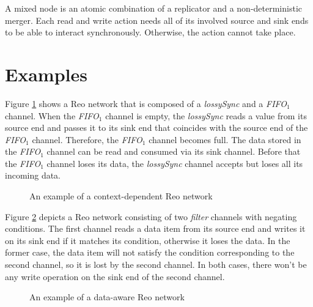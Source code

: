 
 A mixed node is an atomic combination of a replicator and a non-deterministic merger. Each read and write action needs all of its involved source and sink ends to be able to interact synchronously. Otherwise, the action cannot take place.

\section{Examples}
%
\begin{BehExample}
 Figure \ref{fig:reoex1} shows a Reo network that is composed of a \emph{lossySync} and a \emph{FIFO$_1$} channel. When the \emph{FIFO$_1$} channel is empty, the \emph{lossySync} reads a value from its source end and passes it to its sink end that coincides with the source end of the \emph{FIFO$_1$} channel. Therefore, the \emph{FIFO$_1$} channel becomes full. The data stored in the \emph{FIFO$_1$} channel can be read and consumed via its sink channel. Before that the \emph{FIFO$_1$} channel loses its data, the  \emph{lossySync} channel accepts but loses all its incoming data. %

\begin{figure}[!ht]
\centering
\mesallossyfif
\caption{An example of a context-dependent Reo network}
\label{fig:reoex1}
\end{figure}
\end{BehExample}

\begin{BehExample}
Figure \ref{fig:reoex2} depicts a Reo network consisting of two \emph{filter} channels with negating conditions. The first channel reads a data item from its source end and writes it on its sink end if it matches its condition, otherwise it loses the data. In the former case, the data item will not satisfy the condition corresponding to the second channel, so it is lost by the second channel. In both cases, there won't be any write operation on the sink end of the second channel. 

\begin{figure}[!h]
\centering
\mesaldofilter
\caption{An example of a data-aware Reo network}
\label{fig:reoex2}
\end{figure}
\end{BehExample}

